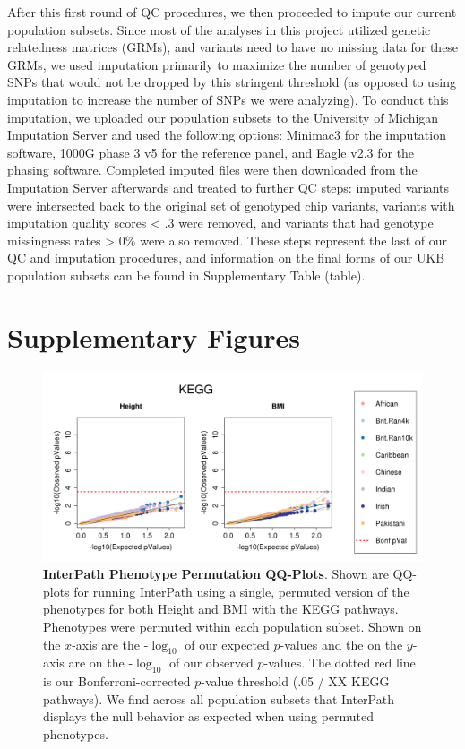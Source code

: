 \documentclass[12pt, a4paper]{article}
\begin{document}
After this first round of QC procedures, we then proceeded to impute our current population subsets. Since most of the analyses in this project utilized genetic relatedness matrices (GRMs), and variants need to have no missing data for these GRMs, we used imputation primarily to maximize the number of genotyped SNPs that would not be dropped by this stringent threshold (as opposed to using imputation to increase the number of SNPs we were analyzing). To conduct this imputation, we uploaded our population subsets to the University of Michigan Imputation Server \citep{Das2016} and used the following options: Minimac3 for the imputation software, 1000G phase 3 v5 for the reference panel, and Eagle v2.3 for the phasing software. Completed imputed files were then downloaded from the Imputation Server afterwards and treated to further QC steps: imputed variants were intersected back to the original set of genotyped chip variants, variants with imputation quality scores < .3 were removed, and variants that had genotype missingness rates > 0\% were also removed. These steps represent the last of our QC and imputation procedures, and information on the final forms of our UKB population subsets can be found in Supplementary Table (table).

\section{Supplementary Figures}\label{Supplementary-Figures}

\begin{figure}[htbp]
\centering
\includegraphics[scale=.35]{Images/Supp/InterPath_Supp_Figure_perm1_QQPlots_KEGG_vs1.png}
\caption[TBD]{\textbf{InterPath Phenotype Permutation QQ-Plots}. Shown are QQ-plots for running InterPath using a single, permuted version of the phenotypes for both Height and BMI with the KEGG pathways. Phenotypes were permuted within each population subset. Shown on the $x$-axis are the -$\log_{10}$ of our expected $p$-values and the on the $y$-axis are on the -$\log_{10}$ of our observed $p$-values. The dotted red line is our Bonferroni-corrected $p$-value threshold (.05 / XX KEGG pathways). We find across all population subsets that InterPath displays the null behavior as expected when using permuted phenotypes.}
\label{InterPath-Supp-Figure-perm1-QQPlots-KEGG}
\end{figure}
\end{document}
